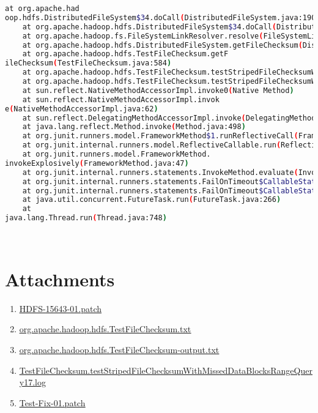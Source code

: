\documentclass{report}%
\begin{document}
\begin{lstlisting}[language=bash]
	at org.apache.had
oop.hdfs.DistributedFileSystem$34.doCall(DistributedFileSystem.java:1902)
	at org.apache.hadoop.hdfs.DistributedFileSystem$34.doCall(DistributedFileSystem.java:1899)
	at org.apache.hadoop.fs.FileSystemLinkResolver.resolve(FileSystemLinkResolver.java:81)
	at org.apache.hadoop.hdfs.DistributedFileSystem.getFileChecksum(DistributedFileSystem.java:1916)
	at org.apache.hadoop.hdfs.TestFileChecksum.getF
ileChecksum(TestFileChecksum.java:584)
	at org.apache.hadoop.hdfs.TestFileChecksum.testStripedFileChecksumWithMissedDataBlocksRangeQuery(TestFileChecksum.java:295)
	at org.apache.hadoop.hdfs.TestFileChecksum.testStripedFileChecksumWithMissedDataBlocksRangeQuery8(TestFileChecksum.java:388)
	at sun.reflect.NativeMethodAccessorImpl.invoke0(Native Method)
	at sun.reflect.NativeMethodAccessorImpl.invok
e(NativeMethodAccessorImpl.java:62)
	at sun.reflect.DelegatingMethodAccessorImpl.invoke(DelegatingMethodAccessorImpl.java:43)
	at java.lang.reflect.Method.invoke(Method.java:498)
	at org.junit.runners.model.FrameworkMethod$1.runReflectiveCall(FrameworkMethod.java:50)
	at org.junit.internal.runners.model.ReflectiveCallable.run(ReflectiveCallable.java:12)
	at org.junit.runners.model.FrameworkMethod.
invokeExplosively(FrameworkMethod.java:47)
	at org.junit.internal.runners.statements.InvokeMethod.evaluate(InvokeMethod.java:17)
	at org.junit.internal.runners.statements.FailOnTimeout$CallableStatement.call(FailOnTimeout.java:298)
	at org.junit.internal.runners.statements.FailOnTimeout$CallableStatement.call(FailOnTimeout.java:292)
	at java.util.concurrent.FutureTask.run(FutureTask.java:266)
	at 
java.lang.Thread.run(Thread.java:748)
\end{lstlisting} \ \newline%
\newline%
~

%
\section{Attachments}%
\label{sec:Attachments}%
\begin{enumerate}%
\item%
\href{https://issues.apache.org/jira/secure/attachment/13014427/HDFS-15643-01.patch}{\underline{HDFS{-}15643{-}01.patch}}%
\item%
\href{https://issues.apache.org/jira/secure/attachment/13014322/org.apache.hadoop.hdfs.TestFileChecksum.txt}{\underline{org.apache.hadoop.hdfs.TestFileChecksum.txt}}%
\item%
\href{https://issues.apache.org/jira/secure/attachment/13014321/org.apache.hadoop.hdfs.TestFileChecksum-output.txt}{\underline{org.apache.hadoop.hdfs.TestFileChecksum{-}output.txt}}%
\item%
\href{https://issues.apache.org/jira/secure/attachment/13014043/TestFileChecksum.testStripedFileChecksumWithMissedDataBlocksRangeQuery17.log}{\underline{TestFileChecksum.testStripedFileChecksumWithMissedDataBlocksRangeQuery17.log}}%
\item%
\href{https://issues.apache.org/jira/secure/attachment/13014377/Test-Fix-01.patch}{\underline{Test{-}Fix{-}01.patch}}%
\end{enumerate}
\end{document}
